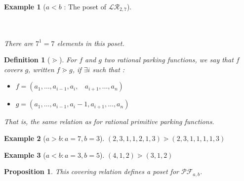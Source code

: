 \documentclass[12pt]{report}
\newtheorem*{prop}{Proposition}
\newtheorem{definition}{Definition}
\newtheorem*{example}{Example}
\begin{document}
\begin{example}[$a < b$ : The poset of $\mathcal{LR}_{2,7}$]
\begin{center}
        ~\\
        ~\\
        There are $7^1 = 7$ elements in this poset.
    \end{center}
\end{example}

\begin{definition}[$\gtrdot$]
    For $f$ and $g$ two rational parking functions, we say
    that $f$ covers $g$, written $f \gtrdot g$, if
    $\exists i$ such that :
    \begin{itemize}
        \item $f = (a_1, \ldots, a_{i-1}, a_i,\ \ \ \ 
            a_{i+1}, \ldots, a_n)$
        \item $g = (a_1, \ldots, a_{i-1}, a_i - 1, a_{i+1},
        \ldots, a_n)$
    \end{itemize}
    That is, the same relation as for rational primitive
    parking functions.
\end{definition}

\begin{example}[$a > b : a = 7, b = 3$]
    $(2, 3, 1, 1, 2, 1, 3) \gtrdot (2, 3, 1, 1, 1, 1, 3)$    
\end{example}

\begin{example}[$a < b : a = 3, b = 5$]
    $(4, 1, 2) \gtrdot (3, 1, 2)$    
\end{example}

\begin{prop}
    This covering relation defines a \emph{poset}
    for $\mathcal{PF}_{a,b}$.
\end{prop}
\end{document}
